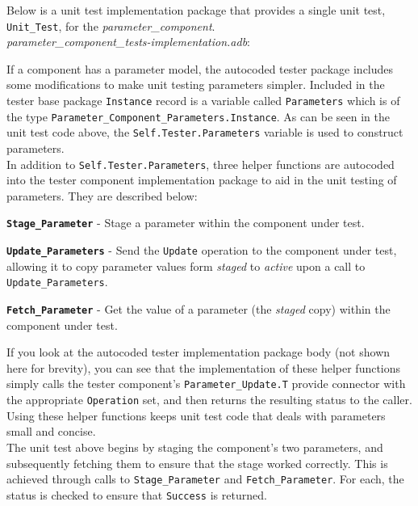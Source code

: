 Below is a unit test implementation package that provides a single unit test, \texttt{Unit\_Test}, for the \textit{parameter\_component}. \\

\textit{parameter\_component\_tests-implementation.adb}:

If a component has a parameter model, the autocoded tester package includes some modifications to make unit testing parameters simpler. Included in the tester base package \texttt{Instance} record is a variable called \texttt{Parameters} which is of the type \texttt{Parameter\_Component\_Parameters.Instance}. As can be seen in the unit test code above, the \texttt{Self.Tester.Parameters} variable is used to construct parameters. \\

In addition to \texttt{Self.Tester.Parameters}, three helper functions are autocoded into the tester component implementation package to aid in the unit testing of parameters. They are described below:

\vspace{5mm} %
\begin{spaceditemize}
  \item \textbf{\texttt{Stage\_Parameter}} - Stage a parameter within the component under test.
  \item \textbf{\texttt{Update\_Parameters}} - Send the \texttt{Update} operation to the component under test, allowing it to copy parameter values form \textit{staged} to \textit{active} upon a call to \texttt{Update\_Parameters}.
  \item \textbf{\texttt{Fetch\_Parameter}} - Get the value of a parameter (the \textit{staged} copy) within the component under test.
\end{spaceditemize}
\vspace{5mm} %

If you look at the autocoded tester implementation package body (not shown here for brevity), you can see that the implementation of these helper functions simply calls the tester component's \texttt{Parameter\_Update.T} provide connector with the appropriate \texttt{Operation} set, and then returns the resulting status to the caller. Using these helper functions keeps unit test code that deals with parameters small and concise. \\

The unit test above begins by staging the component's two parameters, and subsequently fetching them to ensure that the stage worked correctly. This is achieved through calls to \texttt{Stage\_Parameter} and \texttt{Fetch\_Parameter}. For each, the status is checked to ensure that \texttt{Success} is returned. \\

